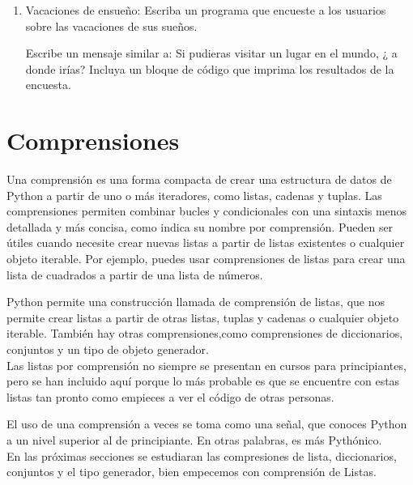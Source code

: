 \begin{enumerate}[6.5.1]
	\item Vacaciones de ensueño: Escriba un programa que encueste a los usuarios sobre las vacaciones de sus sueños.
	
	Escribe un mensaje similar a: Si pudieras visitar un lugar en el mundo, ¿ a donde irías? 
	Incluya un bloque de código que imprima los resultados de la encuesta.
	
	
\end{enumerate}	











\section{Comprensiones} %

Una comprensión es una forma compacta de crear una estructura de datos de Python  a partir de uno o más
iteradores, como listas, cadenas y tuplas. Las comprensiones  permiten combinar bucles y condicionales con una sintaxis
menos detallada y más concisa, como indica su nombre por comprensión.  Pueden ser útiles cuando necesite crear nuevas listas a partir de listas existentes o cualquier objeto iterable. Por ejemplo, puedes usar comprensiones de listas para crear una lista de cuadrados a partir de una lista de números. 

Python permite una construcción  llamada de comprensión de listas, que nos permite crear listas a partir de otras listas, tuplas y cadenas o cualquier objeto iterable. También hay otras comprensiones,como  comprensiones de diccionarios, conjuntos y un tipo de objeto generador.\\ 

Las listas por comprensión no siempre se presentan en cursos para principiantes, pero se han incluido aquí porque lo más probable es que se encuentre con estas listas tan pronto como empieces a ver el código de otras personas.

El uso de una comprensión a veces se toma como una señal, que conoces Python a un nivel superior al de principiante. En otras palabras, es más Pythónico.\\

En las próximas secciones se estudiaran las compresiones de lista, diccionarios, conjuntos y el tipo generador, bien empecemos con comprensión de Listas. %


